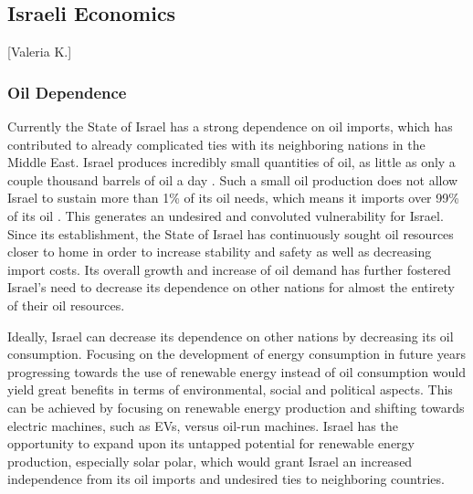 \documentclass[12pt]{article}                         %
\begin{document}
\subsection{Israeli Economics}[Valeria K.]
\subsubsection{Oil Dependence}
Currently the State of Israel has a strong dependence on oil imports, which has contributed to already complicated ties with its neighboring nations in the Middle East. Israel produces incredibly small quantities of oil, as little as only a couple thousand barrels of oil a day \cite{Engber2006WhereOil}. Such a small oil production does not allow Israel to sustain more than 1\% of its oil needs, which means it imports over 99\% of its oil \cite{Engber2006WhereOil}. This generates an undesired and convoluted vulnerability for Israel. Since its establishment, the State of Israel has continuously sought oil resources closer to home in order to increase stability and safety as well as decreasing import costs. Its overall growth and increase of oil demand has further fostered Israel's need to decrease its dependence on other nations for almost the entirety of their oil resources. 

Ideally, Israel can decrease its dependence on other nations by decreasing its oil consumption. Focusing on the development of energy consumption in future years progressing towards the use of renewable energy instead of oil consumption would yield great benefits in terms of environmental, social and political aspects. This can be achieved by focusing on renewable energy production and shifting towards electric machines, such as EVs, versus oil-run machines. Israel has the opportunity to expand upon its untapped potential for renewable energy production, especially solar polar, which would grant Israel an increased independence from its oil imports and undesired ties to neighboring countries.
\end{document}
